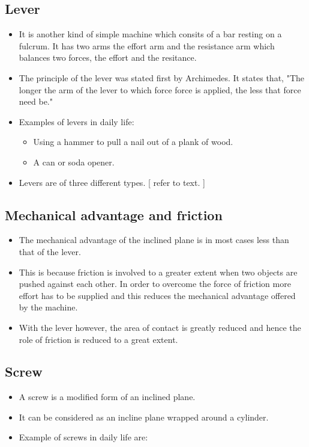 \documentclass[12pt]{book}
\begin{document}
\subsection*{Lever}
\begin{itemize}
    \item It is another kind of simple machine which consits of a bar resting on a fulcrum. It has two arms the effort arm and the resistance arm which balances two forces, the effort and the resitance.

    \item The principle of the lever was stated first by Archimedes. It states that, "The longer the arm of the lever to which force force is applied, the less that force need be."
    \item Examples of levers in daily life:
	\begin{itemize}
	    \item Using a hammer to pull a nail out of a plank of wood.
	    \item A can or soda opener.
	\end{itemize}
    \item Levers are of three different types. [ refer to text. ]
\end{itemize}

\subsection*{Mechanical advantage and friction}
\begin{itemize}
    \item The mechanical advantage of the inclined plane is in most cases less than that of the lever.
    \item This is because friction is involved to a greater extent when two objects are pushed against each other. In order to overcome the force of friction more effort has to be supplied and this reduces the mechanical advantage offered by the machine.
    \item With the lever however,  the area of contact is greatly reduced and hence the role of friction is reduced to a great extent.

\end{itemize}
\subsection*{Screw}
\begin{itemize}
\item A screw is a modified form of an inclined plane.
\item It can be considered as an incline plane wrapped around a cylinder.
\item Example of screws in daily life are:


\end{itemize}
\end{document}
